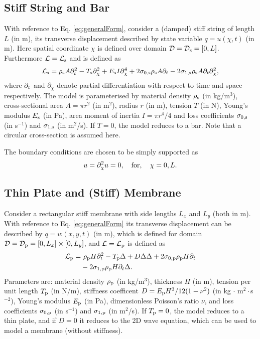 \documentclass{article}
\begin{document}
\subsection{Stiff String and Bar}
With reference to Eq. \eqref{eq:generalForm}, consider a (damped) stiff string of length $L$ (in m), its transverse displacement described by state variable $q = u(\chi, t)$ (in m). Here spatial coordinate $\chi$ is defined over domain $\mathcal{D} = \mathcal{D}_{\text{s}} = [0, L]$. Furthermore $\mathcal{L} = \mathcal{L}_{\text{s}}$ and is defined as \cite{Bensa2003}
\begin{equation}
    \mathcal{L}_\stxt = \rho_\stxt A\ptt - T_\stxt \pcc + E_\stxt I \pcccc + 2\szX[\stxt]\rho_\stxt A\pt - 2 \soX[\stxt]\rho_\stxt A\pt\pcc,
\end{equation}
where $\partial_t$ and $\partial_\chi$ denote partial differentiation with respect to time and space respectively. The model is parameterised by material density $\rho_{\text{s}}$ (in kg/m$^3$), cross-sectional area $A = \pi r^2$ (in m$^2$), radius $r$ (in m), tension $T$ (in N), Young's modulus $E_{\text{s}}$ (in Pa), area moment of inertia $I = \pi r^4/4$ and loss coefficients $\szX[\stxt]$ (in s$^{-1}$) and $\soX[\stxt]$ (in m$^2$/s). If $T=0$, the model reduces to a bar. Note that a circular cross-section is assumed here. 

The boundary conditions are chosen to be simply supported as
\begin{equation}
    u = \partial_{\chi}^2 u = 0, \quad \text{for}, \quad \chi = 0, L.
\end{equation}

\subsection{Thin Plate and (Stiff) Membrane}
Consider a rectangular stiff membrane with side lengths $L_x$ and $L_y$ (both in m). With reference to Eq. \eqref{eq:generalForm} its transverse displacement can be described by $q = w(x, y, t)$ (in m), which is defined for domain
$\mathcal{D} = \mathcal{D}_{\text{p}} = [0, L_x] \times [0, L_y]$, and $\mathcal{L} = \mathcal{L}_{\text{p}}$ is defined as \cite{Fletcher1998}
\begin{equation}
    \begin{aligned}
        \mathcal{L}_\ptxt = &\ \rho_\ptxt H\ptt - T_\ptxt \Delta + D \Delta\Delta+ 2\szX[\ptxt]\rho_\ptxt H\pt \\
        & - 2 \soX[\ptxt]\rho_\ptxt H\pt\Delta.
    \end{aligned}
\end{equation}
Parameters are: material density $\rho_{\text{p}}$ (in kg/m$^3$), thickness $H$ (in m), tension per unit length $T_{\text{p}}$ (in N/m), stiffness coefficent $D = E_{\text{p}} H^3 / 12 (1-\nu^2)$ (in kg $\cdot$ m$^2\cdot$s$^{-2}$), Young's modulus $E_{\text{p}}$ (in Pa), dimensionless Poisson's ratio $\nu$, and loss coefficients $\szX[\ptxt]$ (in s$^{-1}$) and $\soX[\ptxt]$ (in m$^2$/s).
If $T_{\text{p}} = 0$, the model reduces to a thin plate, and if $D=0$ it reduces to the 2D wave equation, which can be used to model a membrane (without stiffness).
\end{document}
